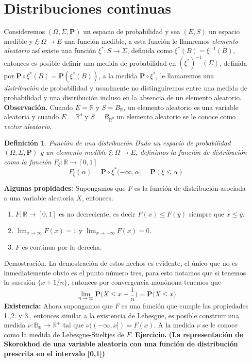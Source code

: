 \documentclass[letterpaper]{book}
\newtheorem{def.}{Definici\'on}[section]
\newcommand{\prob}{\textbf{P}}
\newcommand{\eje}{{\newline \noindent \sc \textbf{Ejercicio. }}}
\newcommand{\obs}{{\newline \noindent \sc \textbf{Observación. }}}
\newcommand{\dem}{{\noindent \sc Demostraci\'on. }}
\newcommand{\om}{\ensuremath{\Omega}}
\newcommand{\sig}{\ensuremath{\Sigma}}
\newcommand{\re}{\ensuremath{\mathbb R }}
\begin{document}
\section{Distribuciones continuas}
\label{sec:org631636c}
\noindent Consideremos \((\om,\sig,\prob)\) un espacio de probabilidad y sea \((E,S)\) un espacio medible y \(\xi:\om\rightarrow E\) una función medible, a esta función le llamremos \emph{elemento aleatorio} así existe una función \(\xi^{*}:S\rightarrow\sig\), definida como \(\xi^{*}(B)=\xi^{-1}(B)\), entonces es posible definir una medida de probabilidad en \((\xi^{*})^{-1}(\sig)\), definida por \(\prob\circ\xi^{*}(B)=\prob(\xi^{*}(B))\), a la medida \(\prob\circ\xi^{*}\), le llamaremos una \emph{distribución} de probabilidad y usualmente no distinguiremos entre una medida de probabilidad y una distribución incluso en la absencia de un elemento aleatorio.
\obs Cuando \(E=\re\) y \(S=B_{\re}\), un elemento aleatorio es una variable aleatoria y cuando \(E=\re^{d}\) y \(S=B_{\re^{d}}\) un elemento aleatorio se le conoce como \emph{vector aleatorio}.
\begin{def.}{Función de una distribución}
Dado un espacio de probabilidad \((\om,\sig,\prob)\) y un elemento medible \(\xi:\om\rightarrow E\), definimos la \textit{función} de distribución como la función \(F_{\xi}:\re\rightarrow[0,1]\)
\[
    F_{\xi}(\alpha)=\prob\circ\xi^{*}(-\infty,\alpha]=\prob(\xi\leq\alpha)
\]
\end{def.}
\noindent \textbf{Algunas propidades:} Supongamos que \(F\) es la función de distribución asociada a una variable aleatoria \(X\), entonces.
\begin{enumerate}
\item \(F:\re\rightarrow[0,1]\) es no decreciente, es decir \(F(x)\leq F(y)\) siempre que \(x\leq y\).
\item \(\lim_{x\rightarrow\infty}F(x)=1\) y \(\lim_{x\rightarrow -\infty}F(x)=0\).
\item \(F\) es continua por la derecha.
\end{enumerate}
\dem La demostración de estos hechos es evidente, el único que no es inmediatemente obvio es el punto número tres, para esto notamos que si tenemos la susesión \(\{x+1/n\}\), entonces por convergencia monónona tenemos que
\[
    \lim_{n\rightarrow\infty}\prob\Big(X\leq x+\frac{1}{n}\Big)=\prob\Big(X\leq x\Big)
\]
\noindent \textbf{Existencia:} Ahora supongamos que \(F\) es una función que cumple las propiedades 1.,2. y 3., entonces similar a la existencia de Lebesgue, es posible construir una medida \(\nu:\mathbb{B}_{\re}\rightarrow\re^{+}\) tal que \(\nu((-\infty,x])=F(x)\). A la medida \(\nu\) se le conoce como la medida de Lebesgue-Stieltjes de \(F\).
\eje \textbf{(La representación de Skorokhod de una variable aleatoria con una función de distribución prescrita en el intervalo [0,1])}\\
\end{document}
